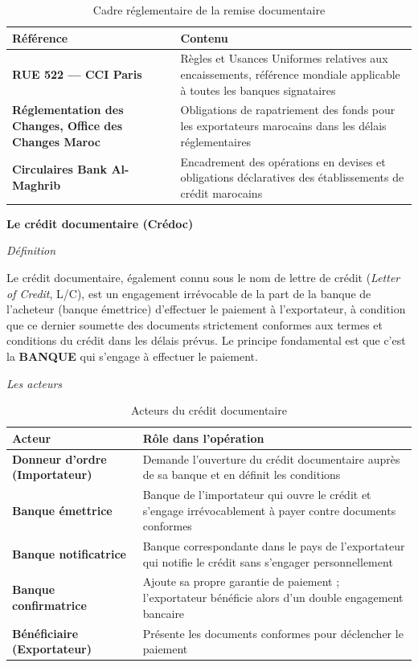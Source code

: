 \documentclass[12pt,a4paper]{report}
\begin{document}
\begin{table}[h!]
\centering
\begin{tabularx}{\textwidth}{>{\bfseries}l X}
\toprule
Référence & Contenu \\
\midrule
RUE 522 --- CCI Paris & Règles et Usances Uniformes relatives aux encaissements, référence mondiale applicable à toutes les banques signataires \\
\addlinespace
Réglementation des Changes, Office des Changes Maroc & Obligations de rapatriement des fonds pour les exportateurs marocains dans les délais réglementaires \\
\addlinespace
Circulaires Bank Al-Maghrib & Encadrement des opérations en devises et obligations déclaratives des établissements de crédit marocains \\
\bottomrule
\end{tabularx}
\caption{Cadre réglementaire de la remise documentaire}
\end{table}

\medskip\textbf{Le crédit documentaire (Crédoc)}

\medskip\textit{Définition}

Le crédit documentaire, également connu sous le nom de lettre de crédit (\textit{Letter of Credit}, L/C), est un engagement irrévocable de la part de la banque de l'acheteur (banque émettrice) d'effectuer le paiement à l'exportateur, à condition que ce dernier soumette des documents strictement conformes aux termes et conditions du crédit dans les délais prévus. Le principe fondamental est que c'est la \textbf{BANQUE} qui s'engage à effectuer le paiement.

\medskip\textit{Les acteurs}

\begin{table}[h!]
\centering
\begin{tabularx}{\textwidth}{>{\bfseries}l X}
\toprule
Acteur & Rôle dans l'opération \\
\midrule
Donneur d'ordre (Importateur) & Demande l'ouverture du crédit documentaire auprès de sa banque et en définit les conditions \\
\addlinespace
Banque émettrice & Banque de l'importateur qui ouvre le crédit et s'engage irrévocablement à payer contre documents conformes \\
\addlinespace
Banque notificatrice & Banque correspondante dans le pays de l'exportateur qui notifie le crédit sans s'engager personnellement \\
\addlinespace
Banque confirmatrice & Ajoute sa propre garantie de paiement ; l'exportateur bénéficie alors d'un double engagement bancaire \\
\addlinespace
Bénéficiaire (Exportateur) & Présente les documents conformes pour déclencher le paiement \\
\bottomrule
\end{tabularx}
\caption{Acteurs du crédit documentaire}
\end{table}
\end{document}
